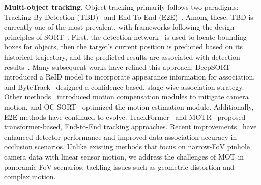 \noindent\textbf{Multi-object tracking.}
Object tracking primarily follows two paradigms: Tracking-By-Detection (TBD)~\cite{Chen_2024_CVPR,Du_2024_CVPR,qin2024towards,nettrack2024cvpr,huang2024deconfusetrack,lv2024diffmot,li2023ovtrack,qin2023motiontrack} and End-To-End (E2E)~\cite{ding2024adatrack,li2023end,MeMOTR,zeng2022motr}. 
Among these, TBD is currently one of the most prevalent, with frameworks following the design principles of SORT~\cite{wojke2017simple}. 
First, the detection network~\cite{yolox2021,carion2020end} is used to locate bounding boxes for objects, then the target's current position is predicted based on its historical trajectory, and the predicted results are associated with detection results~\cite{kuhn1955hungarian}. 
Many subsequent works have refined this approach: DeepSORT~\cite{li2022deep} introduced a ReID model to incorporate appearance information for association, and ByteTrack~\cite{zhang2022bytetrack} designed a confidence-based, stage-wise association strategy. 
Other methods~\cite{aharon2022bot,yi2024ucmc,du2023strongsort} introduced motion compensation modules to mitigate camera motion, and OC-SORT~\cite{cao2023observation} optimized the motion estimation module. Additionally, E2E methods have continued to evolve. 
TrackFormer~\cite{meinhardt2021trackformer} and MOTR~\cite{zeng2022motr} proposed transformer-based, End-to-End tracking approaches. 
Recent improvements~\cite{zhang2023motrv2, lv2024diffmot} have enhanced detector performance and improved data association accuracy in occlusion scenarios. 
Unlike existing methods that focus on narrow-FoV pinhole camera data with linear sensor motion, we address the challenges of MOT in panoramic-FoV scenarios, tackling issues such as geometric distortion and complex motion.